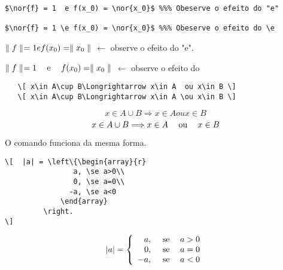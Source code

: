 \begin{tcolorbox}
\begin{lstlisting}
$\nor{f} = 1  e f(x_0) = \nor{x_0}$ %%% Obeserve o efeito do "e"

$\nor{f} = 1 \e f(x_0) = \nor{x_0}$ %%% Obeserve o efeito do \e
\end{lstlisting}
\tcblower

$\parallel f\parallel_{} = 1  e f(x_0) = \parallel x_0\parallel_{}$ {\color{estilo}$\longleftarrow$ observe o efeito do "e".}

$\parallel f\parallel_{} = 1 \hspace{1.25em}\hbox{e}\hspace{1.25em} f(x_0) = \parallel x_0\parallel_{}$ {\color{estilo}$\longleftarrow$ observe o efeito do }
\end{tcolorbox}

\begin{tcolorbox}
\begin{lstlisting}
   \[ x\in A\cup B\Longrightarrow x\in A  ou x\in B \]	
   \[ x\in A\cup B\Longrightarrow x\in A \ou x\in B \]
\end{lstlisting}
	\tcblower
    \[ x\in A\cup B\Longrightarrow x\in A  ou x\in B \]	
    \[ x\in A\cup B\Longrightarrow x\in A \hspace{1.25em}\hbox{ou}\hspace{1.25em} x\in B \]
\end{tcolorbox}

O comando  funciona da mesma forma.
\begin{tcolorbox}
\begin{lstlisting}
\[  |a| = \left\{\begin{array}{r}
                a, \se a>0\\
                0, \se a=0\\
               -a, \se a<0
             \end{array}
         \right.
\]
\end{lstlisting}
\tcblower
\[
|a| = \left\{\begin{array}{r}
                a, \hspace{1.25em}\hbox{se}\hspace{1.25em} a>0\\
                0, \hspace{1.25em}\hbox{se}\hspace{1.25em} a=0\\
               -a, \hspace{1.25em}\hbox{se}\hspace{1.25em} a<0
             \end{array}
\right.
\]
\end{tcolorbox} 